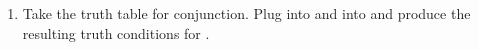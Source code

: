 \begin{enumerate}
\begin{enumerate}
 \end{enumerate}

\item Take the truth table for conjunction. Plug  into  
 and  into  and produce the resulting truth conditions for 
 .
\end{enumerate}
